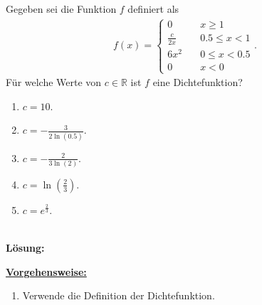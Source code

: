 \newpage

\newpage
\subsection*{}
Gegeben sei die Funktion $ f $ definiert als
\begin{align*}
	f(x)
	=
	\begin{cases}
		0 \quad &x \geq 1\\
		\frac{c}{2x} \quad &0.5 \leq x < 1\\
		6x^2 \quad &0 \leq x < 0.5\\
		0 \quad &x<0
	\end{cases}.
\end{align*}
Für welche Werte von $ c \in \mathbb{R} $ ist $ f $ eine Dichtefunktion?
\renewcommand{\labelenumi}{(\alph{enumi})}
\begin{enumerate}
	\item 
	$ c = 10$.
	\item 
	$ c= -\frac{3}{2 \ln(0.5)} $.
	\item
	$ c= -\frac{2}{3 \ln(2)} $.
	\item
	$ c = \ln \left(\frac{2}{3}\right) $.
	\item
	$ c = e^{\frac{2}{3}} $.
\end{enumerate}
\ \\
\textbf{Lösung:}
\begin{mdframed}
	\underline{\textbf{Vorgehensweise:}}
	\renewcommand{\labelenumi}{\theenumi.}
	\begin{enumerate}
		\item Verwende die Definition der Dichtefunktion.
	\end{enumerate}
\end{mdframed}

